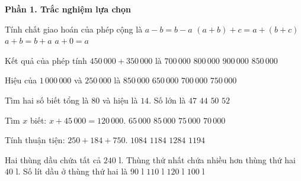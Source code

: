 \textbf{Phần 1. Trắc nghiệm lựa chọn}

\begin{ex} %
Tính chất giao hoán của phép cộng là
\choice
{$a - b = b - a$}
{$(a + b) + c = a + (b + c)$}
{\True $a + b = b + a$}
{$a + 0 = a$}
\end{ex}

\begin{ex} %
Kết quả của phép tính $450\,000 + 350\,000$ là
\choice
{$700\,000$}
{\True $800\,000$}
{$900\,000$}
{$850\,000$}
\end{ex}

\begin{ex} %
Hiệu của $1\,000\,000$ và $250\,000$ là
\choice
{$850\,000$}
{$650\,000$}
{$700\,000$}
{\True $750\,000$}
\end{ex}

\begin{ex} %
Tìm hai số biết tổng là $80$ và hiệu là $14$. Số lớn là
\choice
{\True $47$}
{$44$}
{$50$}
{$52$}
\end{ex}

\begin{ex} %
Tìm $x$ biết: $x + 45\,000 = 120\,000$.
\choice
{$65\,000$}
{$85\,000$}
{\True $75\,000$}
{$70\,000$}
\end{ex}

\begin{ex} %
Tính thuận tiện: $250 + 184 + 750$.
\choice
{$1084$}
{\True $1184$}
{$1284$}
{$1194$}
\end{ex}

\begin{ex} %
Hai thùng dầu chứa tất cả $240\text{ l}$. Thùng thứ nhất chứa nhiều hơn thùng thứ hai $40\text{ l}$. Số lít dầu ở thùng thứ hai là
\choice
{$90\text{ l}$}
{$110\text{ l}$}
{$120\text{ l}$}
{\True $100\text{ l}$}
\end{ex}

